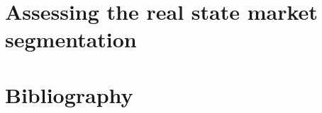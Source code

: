 \documentclass[
	10pt, %
	a4paper,
]{LegrandOrangeBook}
\begin{document}
\chapterspaceabove{6.75cm}
\chapterspacebelow{7.25cm}

\chapter{Assessing the real state market segmentation}


\stopcontents[part] %


\chapterimage{} %
\chapterspaceabove{2.5cm} %
\chapterspacebelow{2cm} %


\chapter*{Bibliography}
\printbibliography




\end{document}
